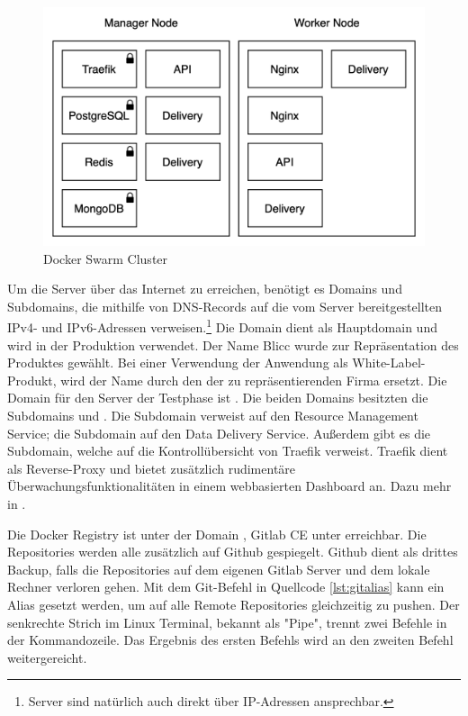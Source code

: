 \begin{figure}
    \begin{center}
    \includegraphics[scale=0.2]{img/abbildungen/Cluster}
    \end{center}
    \caption{Docker Swarm Cluster}
    \label{figure:dockerswarmcluster}
\end{figure}


Um die Server über das Internet zu erreichen, benötigt es Domains
und Subdomains, die mithilfe von DNS-Records auf die vom Server bereitgestellten
IPv4- und IPv6-Adressen verweisen.\footnote{Server sind natürlich auch
direkt über IP-Adressen ansprechbar.} Die Domain  dient als
Hauptdomain und wird in der Produktion verwendet. Der Name Blicc
wurde zur Repräsentation des Produktes gewählt. Bei einer Verwendung der Anwendung
als White-Label-Produkt, wird der Name durch den der
zu repräsentierenden Firma ersetzt. Die Domain für den
Server der Testphase ist . Die beiden Domains besitzten die
Subdomains  und . Die Subdomain  verweist auf
den Resource Management Service; die Subdomain  auf den Data Delivery Service.
Außerdem gibt es die  Subdomain, welche auf die Kontrollübersicht von Traefik
verweist. Traefik dient als Reverse-Proxy und bietet zusätzlich rudimentäre
Überwachungsfunktionalitäten in einem webbasierten Dashboard an.
Dazu mehr in .

Die Docker Registry ist unter der Domain , Gitlab CE
unter  erreichbar. Die Repositories werden alle zusätzlich
auf Github gespiegelt. Github dient als drittes Backup, falls die Repositories auf dem
eigenen Gitlab Server und dem lokale Rechner verloren gehen. Mit dem Git-Befehl in
Quellcode \ref{lst:gitalias} kann ein Alias gesetzt werden, um auf alle Remote Repositories
gleichzeitig zu pushen. Der senkrechte Strich im Linux Terminal, bekannt als "Pipe",
trennt zwei Befehle in der Kommandozeile. Das Ergebnis des ersten Befehls wird
an den zweiten Befehl weitergereicht.

